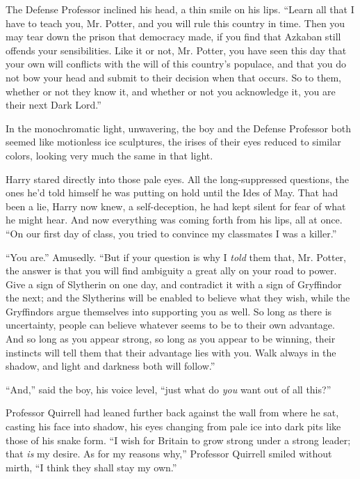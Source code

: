 The Defense Professor inclined his head, a thin smile on his lips. ``Learn all that I have to teach you, Mr. Potter, and you will rule this country in time. Then you may tear down the prison that democracy made, if you find that Azkaban still offends your sensibilities. Like it or not, Mr. Potter, you have seen this day that your own will conflicts with the will of this country's populace, and that you do not bow your head and submit to their decision when that occurs. So to them, whether or not they know it, and whether or not you acknowledge it, you are their next Dark Lord.''

In the monochromatic light, unwavering, the boy and the Defense Professor both seemed like motionless ice sculptures, the irises of their eyes reduced to similar colors, looking very much the same in that light.

Harry stared directly into those pale eyes. All the long-suppressed questions, the ones he'd told himself he was putting on hold until the Ides of May. That had been a lie, Harry now knew, a self-deception, he had kept silent for fear of what he might hear. And now everything was coming forth from his lips, all at once. ``On our first day of class, you tried to convince my classmates I was a killer.''

``You are.'' Amusedly. ``But if your question is why I \emph{told} them that, Mr. Potter, the answer is that you will find ambiguity a great ally on your road to power. Give a sign of Slytherin on one day, and contradict it with a sign of Gryffindor the next; and the Slytherins will be enabled to believe what they wish, while the Gryffindors argue themselves into supporting you as well. So long as there is uncertainty, people can believe whatever seems to be to their own advantage. And so long as you appear strong, so long as you appear to be winning, their instincts will tell them that their advantage lies with you. Walk always in the shadow, and light and darkness both will follow.''

``And,'' said the boy, his voice level, ``just what do \emph{you} want out of all this?''

Professor Quirrell had leaned further back against the wall from where he sat, casting his face into shadow, his eyes changing from pale ice into dark pits like those of his snake form. ``I wish for Britain to grow strong under a strong leader; that \emph{is} my desire. As for my reasons why,'' Professor Quirrell smiled without mirth, ``I think they shall stay my own.''

